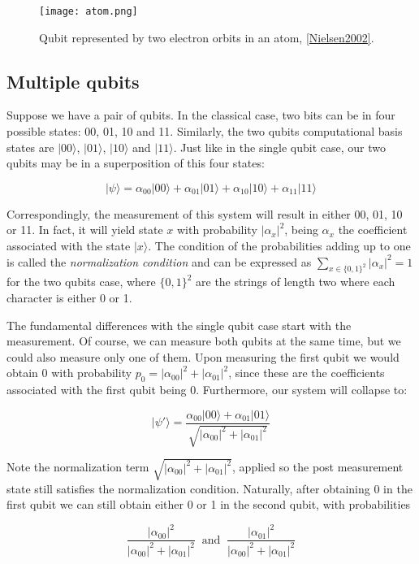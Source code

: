 	\begin{figure}[h]
		\texttt{[image: atom.png]}
		\centering
		\caption{Qubit represented by two electron orbits in an atom, \ref{Nielsen2002}.}
		\label{fig 1.1}
	\end{figure}
	
	\subsection{Multiple qubits}
	
	Suppose we have a pair of qubits. In the classical case, two bits can be in four possible states: 00, 01, 10 and 11. Similarly, the two qubits computational basis states are $|00\rangle$, $|01\rangle$, $|10\rangle$ and $|11\rangle$. Just like in the single qubit case, our two qubits may be in a superposition of this four states:
	
	
	$$ |\psi\rangle = \alpha_{00} |00\rangle + \alpha_{01} |01\rangle + \alpha_{10} |10\rangle + \alpha_{11} |11\rangle $$
	
	Correspondingly, the measurement of this system will result in either 00, 01, 10 or 11. In fact, it will yield state $x$ with probability $|\alpha_x|^2$, being $\alpha_x$ the coefficient associated with the state $|x\rangle$. The condition of the probabilities adding up to one is called the \emph{normalization condition} and can be expressed as $\sum_{x \in \{0,1\}^2} |\alpha_x|^2 = 1$ for the two qubits case, where $\{0,1\}^2$ are the strings of length two where each character is either 0 or 1.
	
	The fundamental differences with the single qubit case start with the measurement. Of course, we can measure both qubits at the same time, but we could also measure only one of them. Upon measuring the first qubit we would obtain 0 with probability $p_0 = |\alpha_{00}|^2 + |\alpha_{01}|^2$, since these are the coefficients associated with the first qubit being 0. Furthermore, our system will collapse to:
	
	$$ |\psi'\rangle = \frac{ \alpha_{00} |00\rangle + \alpha_{01} |01\rangle }{ \sqrt{|\alpha_{00}|^2 + |\alpha_{01}|^2} } $$
	
	Note the normalization term $\sqrt{|\alpha_{00}|^2 + |\alpha_{01}|^2}$, applied so the post measurement state still satisfies the normalization condition. Naturally, after obtaining 0 in the first qubit we can still obtain either 0 or 1 in the second qubit, with probabilities 
	
	$$ \frac{ |\alpha_{00}|^2 }{ |\alpha_{00}|^2 + |\alpha_{01}|^2 }  \ \text{ and } \ 
	\frac{ |\alpha_{01}|^2 }{ |\alpha_{00}|^2 + |\alpha_{01}|^2 } $$
	
